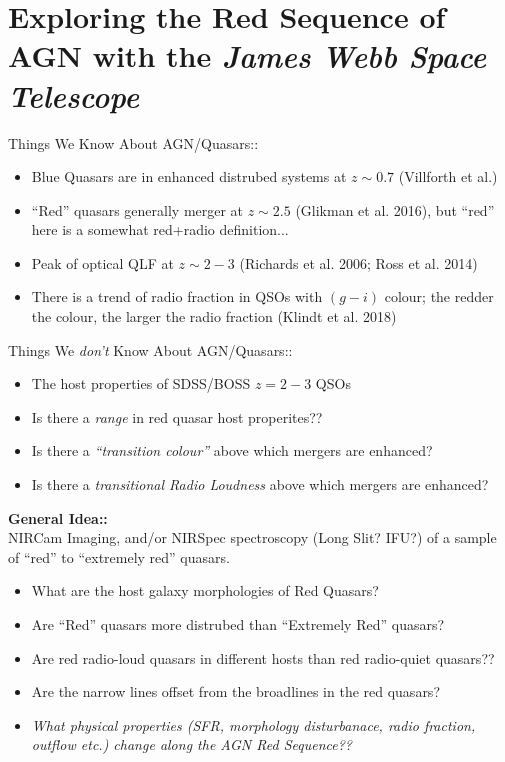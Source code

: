 \section*{Exploring the Red Sequence of AGN with the {\it James Webb Space Telescope}}

\smallskip
\smallskip
\noindent
Things We Know About AGN/Quasars::
\begin{itemize}
\item Blue Quasars are in enhanced distrubed systems at $z\sim0.7$ (Villforth et al.)
\item ``Red'' quasars generally merger at $z\sim2.5$ (Glikman et al. 2016), but ``red'' here is a somewhat red+radio definition...
\item Peak of optical QLF at $z\sim2-3$ (Richards et al. 2006; Ross et al. 2014)
\item There is a trend of radio fraction in QSOs with $(g-i)$ colour; the redder the colour, the larger 
the radio fraction (Klindt et al. 2018)
\end{itemize}


\smallskip
\smallskip
\noindent
Things We {\it don't} Know About AGN/Quasars::
\begin{itemize}
\item The host properties of SDSS/BOSS $z=2-3$ QSOs
\item Is there a {\it range} in red quasar host properites??
\item Is there a {\it ``transition colour''} above which mergers are enhanced?
\item Is there a {\it transitional Radio Loudness} above which mergers are enhanced?
\end{itemize}


\smallskip
\smallskip
\noindent
{\bf General Idea::} \\
NIRCam Imaging, and/or NIRSpec spectroscopy (Long Slit? IFU?) of a sample of ``red'' to ``extremely red'' quasars. \\
\begin{itemize}
\item What are the host galaxy morphologies of Red Quasars? 
\item Are ``Red'' quasars more distrubed than ``Extremely Red'' quasars?
\item Are red radio-loud quasars in different hosts than red radio-quiet quasars??
\item Are the narrow lines offset from the broadlines in the red quasars?
\item {\it What physical properties (SFR, morphology disturbanace, radio fraction, outflow etc.) change along the
AGN Red Sequence??}
\end{itemize}



